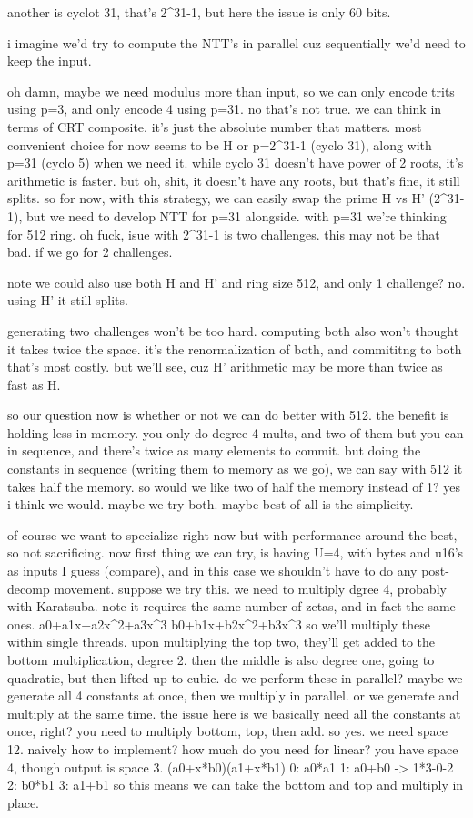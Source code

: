 another is cyclot 31, that's 2^31-1, but here the issue is only 60 bits.

i imagine we'd try to compute the NTT's in parallel cuz sequentially we'd need to keep the input. 

oh damn, maybe we need modulus more than input, so we can only encode trits using p=3, and only encode 4 using p=31.
no that's not true. we can think in terms of CRT composite. it's just the absolute number that matters.
most convenient choice for now seems to be H or p=2^31-1 (cyclo 31), along with p=31 (cyclo 5) when we need it. 
while cyclo 31 doesn't have power of 2 roots, it's arithmetic is faster. but oh, shit, it doesn't have any roots, but that's fine, it still splits. so for now, with this strategy, we can easily swap the prime H vs H' (2^31-1), but we need to develop NTT for p=31 alongside. 
with p=31 we're thinking for 512 ring. 
oh fuck, isue with 2^31-1 is two challenges. this may not be that bad. if we go for 2 challenges. 

note we could also use both H and H' and ring size 512, and only 1 challenge? no. using H' it still splits. 

generating two challenges won't be too hard. computing both also won't thought it takes twice the space. it's the renormalization of both, and commititng to both that's most costly. but we'll see, cuz H' arithmetic may be more than twice as fast as H. 

so our question now is whether or not we can do better with 512. the benefit is holding less in memory. you only do degree 4 mults, and two of them but you can in sequence, and there's twice as many elements to commit. but doing the constants in sequence (writing them to memory as we go), we can say with 512 it takes half the memory. so would we like two of half the memory instead of 1? yes i think we would. maybe we try both. maybe best of all is the simplicity.

of course we want to specialize right now but with performance around the best, so not sacrificing.
now first thing we can try, is having U=4, with bytes and u16's as inputs I guess (compare), and in this case we shouldn't have to do any post-decomp movement. 
suppose we try this. we need to multiply dgree 4, probably with Karatsuba.
note it requires the same number of zetas, and in fact the same ones. 
a0+a1x+a2x^2+a3x^3  b0+b1x+b2x^2+b3x^3
so we'll multiply these within single threads.
upon multiplying the top two, they'll get added to the bottom multiplication, degree 2.
then the middle is also degree one, going to quadratic, but then lifted up to cubic.
do we perform these in parallel? maybe we generate all 4 constants at once, then we multiply in parallel.
or we generate and multiply at the same time. the issue here is we basically need all the constants at once, right? you need to multiply bottom, top, then add. so yes. 
we need space 12. naively how to implement?
how much do you need for linear?
you have space 4, though output is space 3.
(a0+x*b0)(a1+x*b1)
0: a0*a1
1: a0+b0 -> 1*3-0-2
2: b0*b1
3: a1+b1
so this means we can take the bottom and top and multiply in place.


